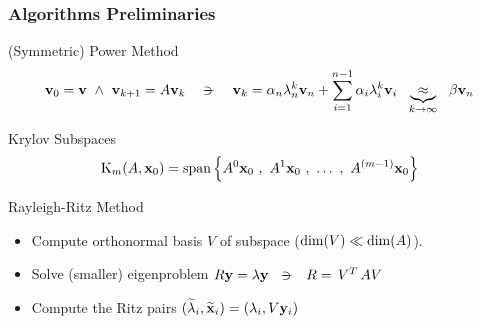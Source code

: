 \begin{frame}
  \frametitle{Algorithms Preliminaries}
  \begin{block}{(Symmetric) Power Method}
    \[
    \joinabove{0}
    \vec{v}_0 = \vec{v} \ds{\land}
    \vec{v}_{k+1} = A\vec{v}_k
    \ds{\ds{\suchthat}}
    \vec{v}_k = \alpha_n \lambda_n^{k} \vec{v}_n +
    \sum\limits_{\tiny{i=1}}^{n-1} \alpha_i \lambda_i^{k} \vec{v}_i
    \ds{}
    \underbrace{\approx}_{k \to \infty}
    \ds{}    
    \beta \vec{v}_n
    \joinbelow{0}
    \]
  \end{block}
  \begin{block}{Krylov Subspaces}
    \[
    \joinabove{0}
    \Krylov{A}{\vec{x}_0}{m} =
    \func{span}
    \left\{
      A^0\vec{x}_0\ds{,} A^1\vec{x}_0\ds{,} \ldots \ds{,}  A^{(m-1)}\vec{x}_0
      \right\}
    \joinbelow{0}      
    \]
  \end{block}
  \begin{block}{Rayleigh-Ritz Method}
    \begin{itemize}
    \item Compute orthonormal basis $V$ of subspace
      ($\operatorname{dim}(V) \ll \operatorname{dim}(A)$).
    \item Solve (smaller) eigenproblem $R\vec{y} = \lambda\vec{y}
      \ds{\suchthat} R = \trans{V} A V$
    \item Compute the Ritz pairs
      $(\widetilde{\lambda}_i,\widetilde{\mathbf{x}}_i) = (\lambda_i, V\mathbf{y}_i)$
    \end{itemize}
  \end{block}
\end{frame}
